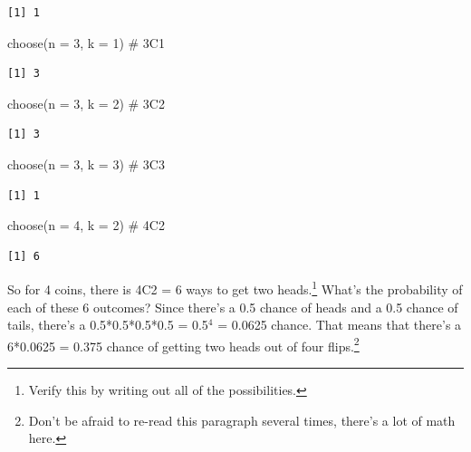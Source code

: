 \documentclass[
  letterpaper,
  DIV=11,
  numbers=noendperiod]{scrreprt}
\newenvironment{Shaded}{\begin{snugshade}}{\end{snugshade}}
\newcommand{\AttributeTok}[1]{\textcolor[rgb]{0.40,0.45,0.13}{#1}}
\newcommand{\CommentTok}[1]{\textcolor[rgb]{0.37,0.37,0.37}{#1}}
\newcommand{\DecValTok}[1]{\textcolor[rgb]{0.68,0.00,0.00}{#1}}
\newcommand{\FunctionTok}[1]{\textcolor[rgb]{0.28,0.35,0.67}{#1}}
\newcommand{\NormalTok}[1]{\textcolor[rgb]{0.00,0.23,0.31}{#1}}
\begin{document}
\begin{verbatim}
[1] 1
\end{verbatim}

\begin{Shaded}
\begin{Highlighting}[]
\FunctionTok{choose}\NormalTok{(}\AttributeTok{n =} \DecValTok{3}\NormalTok{, }\AttributeTok{k =} \DecValTok{1}\NormalTok{) }\CommentTok{\# 3C1}
\end{Highlighting}
\end{Shaded}

\begin{verbatim}
[1] 3
\end{verbatim}

\begin{Shaded}
\begin{Highlighting}[]
\FunctionTok{choose}\NormalTok{(}\AttributeTok{n =} \DecValTok{3}\NormalTok{, }\AttributeTok{k =} \DecValTok{2}\NormalTok{) }\CommentTok{\# 3C2}
\end{Highlighting}
\end{Shaded}

\begin{verbatim}
[1] 3
\end{verbatim}

\begin{Shaded}
\begin{Highlighting}[]
\FunctionTok{choose}\NormalTok{(}\AttributeTok{n =} \DecValTok{3}\NormalTok{, }\AttributeTok{k =} \DecValTok{3}\NormalTok{) }\CommentTok{\# 3C3}
\end{Highlighting}
\end{Shaded}

\begin{verbatim}
[1] 1
\end{verbatim}

\begin{Shaded}
\begin{Highlighting}[]
\FunctionTok{choose}\NormalTok{(}\AttributeTok{n =} \DecValTok{4}\NormalTok{, }\AttributeTok{k =} \DecValTok{2}\NormalTok{) }\CommentTok{\# 4C2}
\end{Highlighting}
\end{Shaded}

\begin{verbatim}
[1] 6
\end{verbatim}

So for 4 coins, there is 4C2 = 6 ways to get two heads.\footnote{Verify
  this by writing out all of the possibilities.} What's the probability
of each of these 6 outcomes? Since there's a 0.5 chance of heads and a
0.5 chance of tails, there's a 0.5*0.5*0.5*0.5 = 0.5\(^4\) = 0.0625
chance. That means that there's a 6*0.0625 = 0.375 chance of getting two
heads out of four flips.\footnote{Don't be afraid to re-read this
  paragraph several times, there's a lot of math here.}
\end{document}

